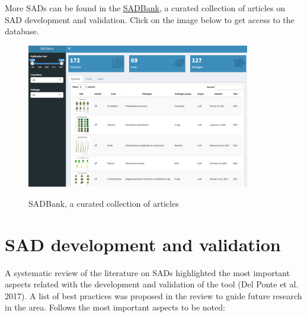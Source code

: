 \documentclass[
  letterpaper,
]{book}
\begin{document}
More SADs can be found in the
\href{https://emdelponte.github.io/sadbank/}{SADBank}, a curated
collection of articles on SAD development and validation. Click on the
image below to get access to the database.

\begin{figure}

{\centering 

\href{https://emdelponte.github.io/sadbank/}{\includegraphics[width=0.87\textwidth,height=\textheight]{imgs/sadbank.png}}

}

\caption{\label{fig-sadbank}SADBank, a curated collection of articles}

\end{figure}

\hypertarget{sad-development-and-validation}{%
\section{SAD development and
validation}\label{sad-development-and-validation}}

A systematic review of the literature on SADs highlighted the most
important aspects related with the development and validation of the
tool (Del Ponte et al. 2017). A list of best practices was proposed in
the review to guide future research in the area. Follows the most
important aspects to be noted:
\end{document}
